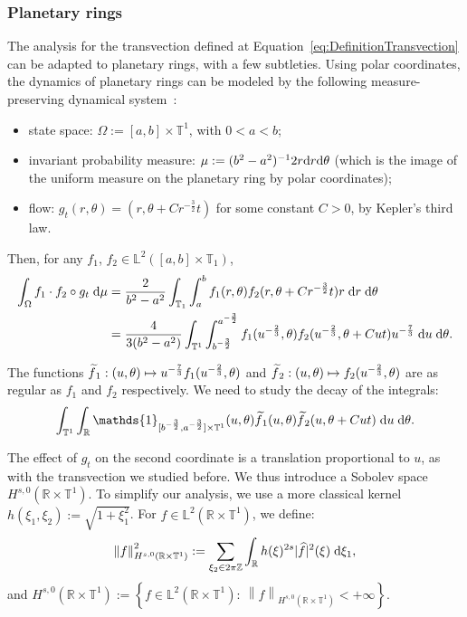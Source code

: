 \documentclass[AHL,Unicode,longabstracts]{cedram}
\newcommand{\Z}{\mathbb{Z}}
\newcommand{\R}{\mathbb{R}}
\newcommand{\Lbb}{\mathbb{L}}
\newcommand{\Tbb}{\mathbb{T}}
\newcommand{\dd}{\;{\rm d}}
\newcommand{\de}{{\rm d}}
\newcommand{\norm}[2]{\left\| #1 \right\|_{#2}}
\newcommand*{\un}{\mathds{1}}
\let\oldtilde\tilde
\renewcommand*{\tilde}[1]{\mathchoice{\widetilde{#1}}{\widetilde{#1}}{\oldtilde{#1}}{\oldtilde{#1}}}\let\oldhat\hat
\renewcommand*{\hat}[1]{\mathchoice{\widehat{#1}}{\widehat{#1}}{\oldhat{#1}}{\oldhat{#1}}}\let\oldforall\forall
\renewcommand*{\forall}{\mathrel{\oldforall}}
\begin{document}
\subsubsection{Planetary rings}\label{subsubsec:AnneauxPlanetaires}

The analysis for the transvection defined at Equation~\eqref{eq:DefinitionTransvection} can be adapted to planetary rings, with a few subtleties. Using polar coordinates, the dynamics of planetary rings can be modeled by the following measure-preserving dynamical system~:
\begin{itemize}
\item state space: $\Omega := [a,b] \times \Tbb^1$, with $0 < a < b$;
\item invariant probability measure: $\mu := (b^2-a^2)^{-1} 2 r \de r \de \theta$ (which is the image of the uniform measure on the planetary ring by polar coordinates);
\item flow: $g_t (r, \theta) = (r, \theta+Cr^{-\frac{3}{2}} t)$ for some constant $C>0$, by Kepler's third law.
\end{itemize}
Then, for any $f_1$, $f_2 \in \Lbb^2 ([a,b] \times \Tbb_1)$,
\begin{align*}
\int_\Omega f_1 \cdot f_2 \circ g_t \dd \mu & = \frac{2}{b^2-a^2} \int_{\Tbb_1} \int_a^b f_1 (r, \theta) f_2 (r, \theta+Cr^{-\frac{3}{2}} t) r \dd r \dd \theta \\
& = \frac{4}{3(b^2-a^2)} \int_{\Tbb^1} \int_{b^{-\frac{3}{2}}}^{a^{-\frac{3}{2}}} f_1 (u^{-\frac{2}{3}}, \theta) f_2 (u^{-\frac{2}{3}}, \theta+C u t) u^{-\frac{7}{3}} \dd u \dd \theta.
\end{align*}

The functions $\tilde{f}_1: (u, \theta) \mapsto u^{-\frac{7}{3}} f_1 (u^{-\frac{2}{3}}, \theta)$ and $\tilde{f}_2:(u, \theta) \mapsto f_2 (u^{-\frac{2}{3}}, \theta)$ are as regular as $f_1$ and $f_2$ respectively. We need to study the decay of the integrals:
\[
\int_{\Tbb^1} \int_\R \un_{[b^{-\frac{3}{2}}, a^{-\frac{3}{2}}]\times \Tbb^1} (u,\theta) \tilde{f}_1 (u, \theta) \tilde{f}_2 (u, \theta+C u t) \dd u \dd \theta.
\]

The effect of $g_t$ on the second coordinate is a translation proportional to $u$, as with the transvection we studied before. We thus introduce a Sobolev space $H^{s, 0} (\R \times \Tbb^1)$. To simplify our analysis, we use a more classical kernel $h(\xi_1, \xi_2) := \sqrt{1+\xi_1^2}$. For $f\in \Lbb^2 (\R \times \Tbb^1)$, we define:
\[
\norm{f}{H^{s,0} (\R \times \Tbb^1)}^2 := \sum_{\xi_2 \in 2\pi\Z} \int_\R h(\xi)^{2s} |\hat{f}|^2 (\xi) \dd \xi_1,
\]
and $H^{s,0} (\R \times \Tbb^1) := \left\{ f \in \Lbb^2 (\R \times \Tbb^1): \ \norm{f}{H^{s,0} (\R \times \Tbb^1)} <+\infty \right\}$.
\end{document}
